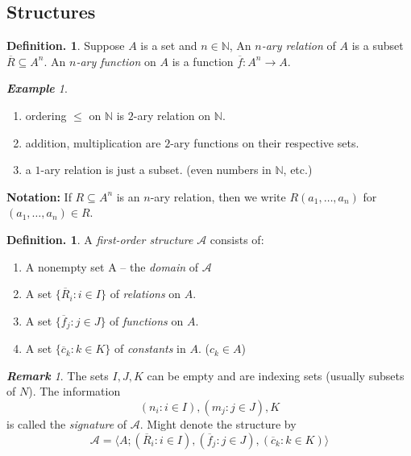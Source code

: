 \documentclass[a4paper,oneside,11pt,DIV=12,parskip=half]{scrartcl}
\newcommand{\N}{\mathbb N}
\theoremstyle{plain}
\theoremstyle{definition}
\newtheorem{definition}[theorem]{Definition.}
\newtheorem{remark, definition}[theorem]{Remark and Definition.}
\newtheorem{lemma, definition}[theorem]{Lemma and Definition.}
\newtheorem{theorem, definition}[theorem]{Theorem and Definition.}
\theoremstyle{remark}
\newtheorem*{remark}{\textbf{Remark}}
\newtheorem*{example}{\textbf{Example}}
\newtheorem*{remark, example}{\textbf{Remark and Exercise}}
\begin{document}
\subsection{Structures}

\begin{definition}
    Suppose $A$ is a set and $n \in \N$, An \emph{$n$-ary relation} of $A$ is a subset $\overline{R} \subseteq A^n$.
    An \emph{$n$-ary function} on $A$ is a function $\overline{f}: A^n \rightarrow A$.
\end{definition}

\begin{example}
\begin{enumerate}
    \item ordering $\leq$ on $\N$ is $2$-ary relation on $\N$.
    \item addition, multiplication are $2$-ary functions on their respective sets.
    \item a $1$-ary relation is just a subset. (even numbers in $\N$, etc.)
\end{enumerate}

\textbf{Notation:} If $R \subseteq A^n$ is an $n$-ary relation, then we write $R(a_1,\dots,a_n)$ for $(a_1,\dots,a_n) \in R$.

\begin{definition}
    A \emph{first-order structure} $\mathcal{A}$ consists of:
    \begin{enumerate}
        \item A nonempty set A -- the \emph{domain} of $\mathcal{A}$
        \item A set $\{\overline{R}_i:i \in I \}$ of \emph{relations} on $A$.
        \item A set $\{\overline{f}_j:j \in J \}$ of \emph{functions} on $A$.
        \item A set $\{\overline{c}_k:k \in K \}$ of \emph{constants} in $A$. ($c_k \in A$)
    \end{enumerate}
\end{definition}
\begin{remark}
The sets $I,J,K$ can be empty and are indexing sets (usually subsets of $N$).
The information 
\[ (n_i : i \in I), (m_j : j \in J), K \] is called the \emph{signature} of $\mathcal{A}$.
Might denote the structure by
\[ \mathcal{A}=\langle A; (\overline{R}_i : i \in I), (\overline{f}_j : j \in J), (\overline{c}_k : k \in K) \rangle \]
\end{remark}
\end{example}
\end{document}
